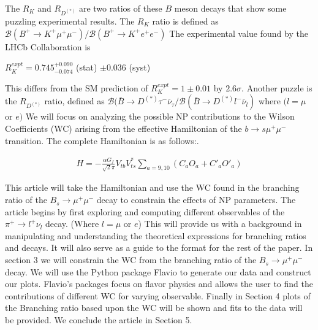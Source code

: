 \documentclass[12pt]{article}
\def \bea{\begin{eqnarray}}
\def \eea{\end{eqnarray}}
\def \onu{\overline{\nu}}
\def \si{\sigma}
\begin{document}
The $R_K$ and $R_{D^{(*)}}$ are two ratios of these $B$ meson decays that show some puzzling experimental results. The $R_K$ ratio is defined as $\mathcal{B}(B^+\rightarrow K^+\mu^+\mu^-)/ \mathcal{B}(B^+\rightarrow K^+e^+e^-)$ The experimental value found by the LHCb Collaboration is \cite{Aaij:2014ora}
\begin{center}
$R^{expt}_{K} = 0.745 _{\num{-0.074}}^{+0.090}$ (stat) $\pm 0.036$ (syst)
\end{center}
This differs from the SM prediction of $R^{expt}_{K} = 1 \pm 0.01$ by $2.6\si$. \cite{Bordone:2016gaq} Another puzzle is the $R_{D^{(*)}}$ ratio, defined as $\mathcal{B}(\bar{B} \rightarrow D^{(*)}\tau^- \onu_{\tau}/ \mathcal{B}(\bar{B} \rightarrow D^{(*)}l^- \onu_{l})$ where $(l= \mu$ or $e)$  We will focus on analyzing the possible NP contributions to the Wilson Coefficients (WC) arising from the effective Hamiltonian of the $b \rightarrow s\mu^+\mu^-$ transition. The complete Hamiltonian is as follows:\cite{Bhattacharya:2016mcc}. 
\begin{center}
\bea
H = -\frac{\alpha G_f}{\sqrt{2}\pi} V_{tb}V^*_{ts}\sum_{a= 9,10}^{}(C_aO_a + C'_aO'_a)
\eea
\end{center}
This article will take the Hamiltonian and use the WC found in the branching ratio of the $B_s \rightarrow \mu^+ \mu^- $ decay to constrain the effects of NP parameters. The article begins by first exploring and computing different observables of the $\pi^+ \rightarrow l^+ \nu_l $ decay. (Where $l= \mu$ or $e$) This will provide us with a background in manipulating and understanding the theoretical expressions for branching ratios and decays. It will also serve as a guide to the format for the rest of the paper. In section 3 we will constrain the WC from the branching ratio of the $B_s \rightarrow \mu^+\mu^-$ decay. We will use the Python package Flavio\cite{flavio} to generate our data and construct our plots. Flavio's packages focus on flavor physics and allows the user to find the contributions of different WC for varying observable. Finally in Section 4 plots of the Branching ratio based upon the WC will be shown and fits to the data will be provided. We conclude the article in Section 5.
\end{document}
